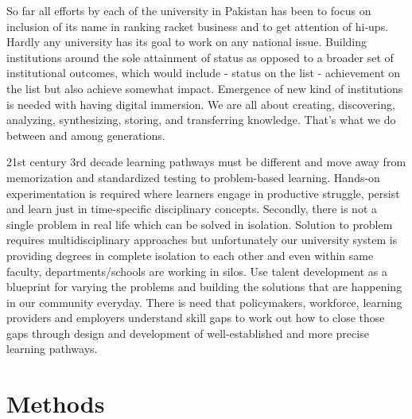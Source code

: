 \documentclass[
  12pt]{article}
\begin{document}
So far all efforts by each of the university in Pakistan has been to
focus on inclusion of its name in ranking racket business and to get
attention of hi-ups. Hardly any university has its goal to work on any
national issue. Building institutions around the sole attainment of
status as opposed to a broader set of institutional outcomes, which
would include - status on the list - achievement on the list but also
achieve somewhat impact. Emergence of new kind of institutions is needed
with having digital immersion. We are all about creating, discovering,
analyzing, synthesizing, storing, and transferring knowledge. That's
what we do between and among generations.

21st century 3rd decade learning pathways must be different and move
away from memorization and standardized testing to problem-based
learning. Hands-on experimentation is required where learners engage in
productive struggle, persist and learn just in time-specific
disciplinary concepts. Secondly, there is not a single problem in real
life which can be solved in isolation. Solution to problem requires
multidisciplinary approaches but unfortunately our university system is
providing degrees in complete isolation to each other and even within
same faculty, departments/schools are working in silos. Use talent
development as a blueprint for varying the problems and building the
solutions that are happening in our community everyday. There is need
that policymakers, workforce, learning providers and employers
understand skill gaps to work out how to close those gaps through design
and development of well-established and more precise learning pathways.

\hypertarget{sec-meth}{%
\section{Methods}\label{sec-meth}}
\end{document}
